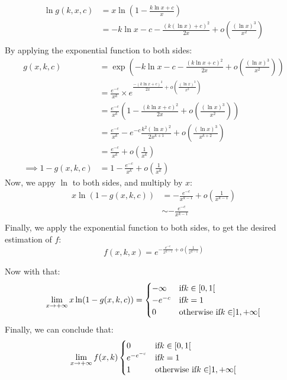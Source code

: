 \begin{align*}
	\ln g(k,x,c)&=x\ln\left(1-\frac{k\ln x+c}{x}\right)\\
	&=-k\ln x-c -\frac{(k(\ln x)+c)^2}{2x}+o\left(\frac{(\ln x)^3}{x^2}\right)\\
\end{align*}
By applying the exponential function to both sides:
\begin{align*}
	g(x,k,c)&=\exp\left(-k\ln x-c -\frac{(k\ln x+c)^2}{2x}+o\left(\frac{(\ln x)^3}{x^2}\right)\right) \\
	&=\frac{e^{-c}}{x^k}\times e^{\frac{-(k\ln x+c)^2}{2x}+o\left(\frac{(\ln x)^3}{x^2}\right)}\\
	&=\frac{e^{-c}}{x^k}\left(1-\frac{(k \ln x+c)^2}{2x}+o\left(\frac{(\ln x)^3}{x^2}\right)\right)  \\
	&=\frac{e^{-c}}{x^k}-e^{-c}\frac{k^2(\ln x)^2}{2x^{k+1}}+o\left(\frac{(\ln x)^3}{x^{k+2}}\right)\\
	&=\frac{e^{-c}}{x^k}+o\left(\frac{1}{x^k}\right)\\
	\implies 1- g(x,k,c)&=1-\frac{e^{-c}}{x^{k}} +o\left(\frac{1}{x^k}\right)
\end{align*}
Now, we appy $\ln$ to both sides, and multiply by $x:$ 
\begin{align*}
	x\ln(1-g(x,k,c))&= -\frac{e^{-c}}{x^{k-1}}+o\left(\frac{1}{x^{k-1}}\right) \\
	&\sim -\frac{e^{-c}}{x^{k-1}}  \\
\end{align*}
Finally, we apply the exponential function to both sides, to get the desired estimation of $f:$
\begin{equation}
	\label{eqn:SinklessAsymptotic}
	 f(x,k,x) = e^{-\frac{e^{-c}}{x^{k-1}}+o(\frac{1}{x^{k-1}})}
\end{equation}

Now with that:
$$
\lim_{x\rightarrow +\infty} x\ln (1-g(x,k,c))=\begin{cases}
	-\infty  & \text{if} \space k\in[0,1[ \\
	-e^{-c} & \text{if}\space k=1  \\
	0 & \text{otherwise if}\space k\in ]1,+\infty[ 
\end{cases}
$$
Finally, we can conclude that:
\begin{equation}
	\label{eqn:SinklessProbabilityLimit}
	\lim_{x\rightarrow +\infty} f(x,k)\begin{cases}
		0  & \text{if} \space k\in[0,1[ \\
		e^{-e^{-c}} & \text{if}\space k=1  \\
		1 & \text{otherwise if}\space k\in ]1,+\infty[ 
	\end{cases}
\end{equation}
